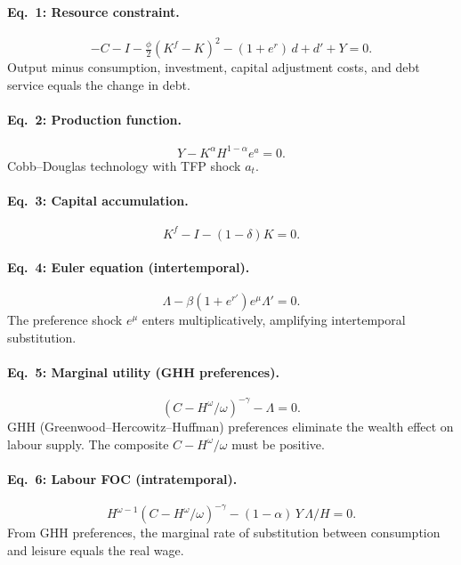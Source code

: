 \documentclass[11pt,a4paper]{article}
\theoremstyle{definition}
\begin{document}
	\paragraph{Eq.~1: Resource constraint.}
	\begin{equation}\label{eq:sgu_rc}
		-C - I - \tfrac{\phi}{2}(K^f - K)^2 - (1 + e^r)\,d + d' + Y = 0.
	\end{equation}
	Output minus consumption, investment, capital adjustment costs, and debt service equals the change in debt.

	\paragraph{Eq.~2: Production function.}
	\begin{equation}\label{eq:sgu_prod}
		Y - K^\alpha H^{1-\alpha} e^a = 0.
	\end{equation}
	Cobb--Douglas technology with TFP shock $a_t$.

	\paragraph{Eq.~3: Capital accumulation.}
	\begin{equation}\label{eq:sgu_kacc}
		K^f - I - (1-\delta) K = 0.
	\end{equation}

	\paragraph{Eq.~4: Euler equation (intertemporal).}
	\begin{equation}\label{eq:sgu_euler}
		\Lambda - \beta (1 + e^{r'}) e^{\mu} \Lambda' = 0.
	\end{equation}
	The preference shock $e^\mu$ enters multiplicatively, amplifying intertemporal substitution.

	\paragraph{Eq.~5: Marginal utility (GHH preferences).}
	\begin{equation}\label{eq:sgu_lam}
		(C - H^\omega / \omega)^{-\gamma} - \Lambda = 0.
	\end{equation}
	GHH (Greenwood--Hercowitz--Huffman) preferences eliminate the wealth effect on labour supply.
	The composite $C - H^\omega/\omega$ must be positive.

	\paragraph{Eq.~6: Labour FOC (intratemporal).}
	\begin{equation}\label{eq:sgu_labor}
		H^{\omega - 1}(C - H^\omega/\omega)^{-\gamma} - (1-\alpha)\,Y\,\Lambda / H = 0.
	\end{equation}
	From GHH preferences, the marginal rate of substitution between consumption and leisure equals the real wage.
\end{document}
